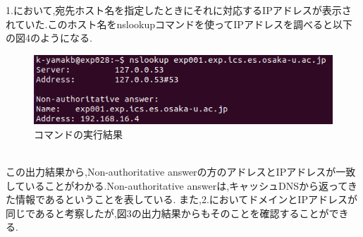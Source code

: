 \documentclass[dvipdfmx]{jarticle}
\begin{document}
\begin{enumerate}
    1.において,宛先ホスト名を指定したときにそれに対応するIPアドレスが表示されていた.このホスト名をnslookupコマンドを使ってIPアドレスを調べると以下の図4のようになる.
    \begin{figure}[h]
        \centering
        \includegraphics[width=12cm]{1-1-3-1.png}
        \caption{コマンドの実行結果}
    \end{figure}
    \\この出力結果から,Non-authoritative answerの方のアドレスとIPアドレスが一致していることがわかる.Non-authoritative answerは,キャッシュDNSから返ってきた情報であるということを表している.
    また,2.においてドメインとIPアドレスが同じであると考察したが,図3の出力結果からもそのことを確認することができる.
\end{enumerate}
\end{document}
